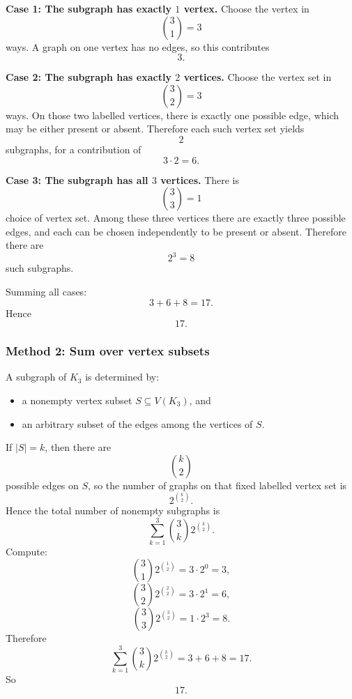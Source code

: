 \documentclass[12pt]{article}
\begin{document}
\medskip
\noindent
\textbf{Case 1: The subgraph has exactly \(1\) vertex.}
Choose the vertex in
\[
\binom{3}{1}=3
\]
ways. A graph on one vertex has no edges, so this contributes
\[
3.
\]

\medskip
\noindent
\textbf{Case 2: The subgraph has exactly \(2\) vertices.}
Choose the vertex set in
\[
\binom{3}{2}=3
\]
ways. On those two labelled vertices, there is exactly one possible edge, which may be either present or absent. Therefore each such vertex set yields
\[
2
\]
subgraphs, for a contribution of
\[
3\cdot 2=6.
\]

\medskip
\noindent
\textbf{Case 3: The subgraph has all \(3\) vertices.}
There is
\[
\binom{3}{3}=1
\]
choice of vertex set. Among these three vertices there are exactly three possible edges, and each can be chosen independently to be present or absent. Therefore there are
\[
2^3=8
\]
such subgraphs.

Summing all cases:
\[
3+6+8=17.
\]
Hence
\[
\boxed{17.}
\]

\subsubsection{Method 2: Sum over vertex subsets}
A subgraph of \(K_3\) is determined by:
\begin{itemize}[leftmargin=*]
  \item a nonempty vertex subset \(S\subseteq V(K_3)\), and
  \item an arbitrary subset of the edges among the vertices of \(S\).
\end{itemize}
If \(|S|=k\), then there are
\[
\binom{k}{2}
\]
possible edges on \(S\), so the number of graphs on that fixed labelled vertex set is
\[
2^{\binom{k}{2}}.
\]
Hence the total number of nonempty subgraphs is
\[
\sum_{k=1}^{3} \binom{3}{k} 2^{\binom{k}{2}}.
\]
Compute:
\[
\binom{3}{1}2^{\binom{1}{2}}
=
3\cdot 2^0=3,
\]
\[
\binom{3}{2}2^{\binom{2}{2}}
=
3\cdot 2^1=6,
\]
\[
\binom{3}{3}2^{\binom{3}{2}}
=
1\cdot 2^3=8.
\]
Therefore
\[
\sum_{k=1}^{3} \binom{3}{k} 2^{\binom{k}{2}}
=
3+6+8=17.
\]
So
\[
\boxed{17.}
\]
\end{document}
